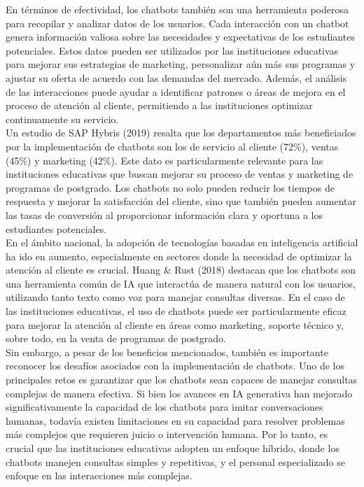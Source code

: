 \documentclass[10pt,a4paper]{article}
\begin{document}
En términos de efectividad, los chatbots también son una herramienta poderosa para recopilar y analizar datos de los usuarios. Cada interacción con un chatbot genera información valiosa sobre las necesidades y expectativas de los estudiantes potenciales. Estos datos pueden ser utilizados por las instituciones educativas para mejorar sus estrategias de marketing, personalizar aún más sus programas y ajustar su oferta de acuerdo con las demandas del mercado. Además, el análisis de las interacciones puede ayudar a identificar patrones o áreas de mejora en el proceso de atención al cliente, permitiendo a las instituciones optimizar continuamente su servicio.\\

Un estudio de SAP Hybris (2019) resalta que los departamentos más beneficiados por la implementación de chatbots son los de servicio al cliente (72\%), ventas (45\%) y marketing (42\%). Este dato es particularmente relevante para las instituciones educativas que buscan mejorar su proceso de ventas y marketing de programas de postgrado. Los chatbots no solo pueden reducir los tiempos de respuesta y mejorar la satisfacción del cliente, sino que también pueden aumentar las tasas de conversión al proporcionar información clara y oportuna a los estudiantes potenciales.\\

En el ámbito nacional, la adopción de tecnologías basadas en inteligencia artificial ha ido en aumento, especialmente en sectores donde la necesidad de optimizar la atención al cliente es crucial. Huang \& Rust (2018) destacan que los chatbots son una herramienta común de IA que interactúa de manera natural con los usuarios, utilizando tanto texto como voz para manejar consultas diversas. En el caso de las instituciones educativas, el uso de chatbots puede ser particularmente eficaz para mejorar la atención al cliente en áreas como marketing, soporte técnico y, sobre todo, en la venta de programas de postgrado.\\

Sin embargo, a pesar de los beneficios mencionados, también es importante reconocer los desafíos asociados con la implementación de chatbots. Uno de los principales retos es garantizar que los chatbots sean capaces de manejar consultas complejas de manera efectiva. Si bien los avances en IA generativa han mejorado significativamente la capacidad de los chatbots para imitar conversaciones humanas, todavía existen limitaciones en su capacidad para resolver problemas más complejos que requieren juicio o intervención humana. Por lo tanto, es crucial que las instituciones educativas adopten un enfoque híbrido, donde los chatbots manejen consultas simples y repetitivas, y el personal especializado se enfoque en las interacciones más complejas.\\
\end{document}

